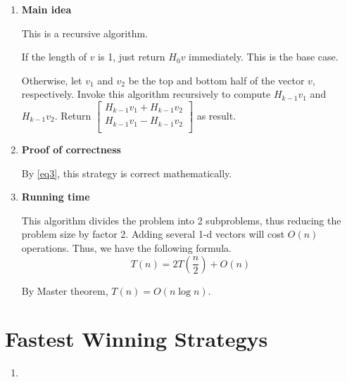 \documentclass[11pt]{article}
\begin{document}
\begin{enumerate}
	\renewcommand{\theenumii}{\roman{enumii}}
	\begin{enumerate}
		\item \textbf{Main idea}
		
		This is a recursive algorithm. 
		
		If the length of $v$ is 1, just return $H_0v$ immediately. This is the base case.
		
		Otherwise, let $v_1$ and $v_2$ be the top and bottom half of the vector $v$, respectively. Invoke this algorithm recursively to compute $H_{k-1}v_1$ and $H_{k-1}v_2$. Return $									\begin{bmatrix} 
					H_{k-1}v_1  + H_{k-1}v_2\\ 
					H_{k-1}v_1  -  H_{k-1}v_2 \\ 
				\end{bmatrix}$ as result.
		\item \textbf{Proof of correctness}
		
		By \eqref{eq3}, this strategy is correct mathematically.
		\item \textbf{Running time}
		
		This algorithm divides the problem into 2 subproblems, thus reducing the problem size by factor 2. Adding several 1-d vectors will cost $O(n)$ operations. Thus, we have the following formula.
		\[
			T(n) = 2T(\frac{n}{2}) + O(n)
		\]
		
		By Master theorem, $T(n) = O(n\log n)$.
		
	\end{enumerate}
\end{enumerate}

 \newpage
  \section{Fastest Winning Strategys}
\renewcommand{\labelenumi}{(\alph{enumi})}
\begin{enumerate}
	\item
\end{enumerate}
\end{document}
